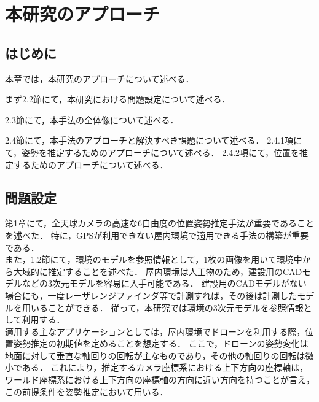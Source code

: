\thispagestyle{empty}
\chapter{本研究のアプローチ}
\label{chap2}
\minitoc

\newpage
\section{はじめに}

本章では，本研究のアプローチについて述べる．

まず2.2節にて，本研究における問題設定について述べる．

2.3節にて，本手法の全体像について述べる．

2.4節にて，本手法のアプローチと解決すべき課題について述べる．
2.4.1項にて，姿勢を推定するためのアプローチについて述べる．
2.4.2項にて，位置を推定するためのアプローチについて述べる．


\clearpage
\section{問題設定}

第1章にて，全天球カメラの高速な6自由度の位置姿勢推定手法が重要であることを述べた．
特に，GPSが利用できない屋内環境で適用できる手法の構築が重要である．
\\

また，1.2節にて，環境のモデルを参照情報として，1枚の画像を用いて環境中から大域的に推定することを述べた．
屋内環境は人工物のため，建設用のCADモデルなどの3次元モデルを容易に入手可能である．
建設用のCADモデルがない場合にも，一度レーザレンジファインダ等で計測すれば，その後は計測したモデルを用いることができる．
従って，本研究では環境の3次元モデルを参照情報として利用する．
\\

適用する主なアプリケーションとしては，屋内環境でドローンを利用する際，位置姿勢推定の初期値を定めることを想定する．
ここで，ドローンの姿勢変化は地面に対して垂直な軸回りの回転が主なものであり，その他の軸回りの回転は微小である．
これにより，推定するカメラ座標系における上下方向の座標軸は，ワールド座標系における上下方向の座標軸の方向に近い方向を持つことが言え，この前提条件を姿勢推定において用いる．
\\

